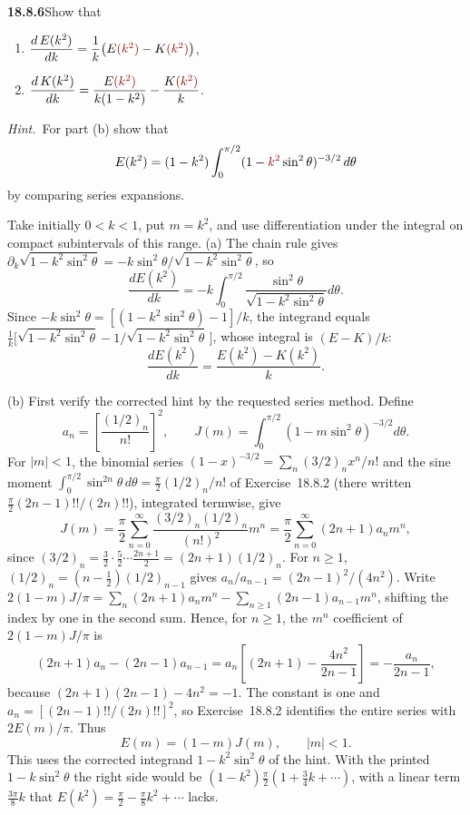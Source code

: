 \par\bigskip
\noindent\textbf{18.8.6}\quad Show that
\begin{enumerate}
\item[(a)] $\dfrac{d\,E(k^{2})}{dk}=\dfrac{1}{k}
\big(E\erratum{(k^{2})}-K\erratum{(k^{2})}\big)$,
\item[(b)] $\dfrac{d\,K(k^{2})}{dk}
=\dfrac{E\erratum{(k^{2})}}{k(1-k^{2})}
-\dfrac{K\erratum{(k^{2})}}{k}$.
\end{enumerate}
\par\emph{Hint.}~For part (b) show that
\[
E(k^{2})=(1-k^{2})\int_{0}^{\pi/2}
(1-\erratum{k^{2}}\sin^{2}\theta)^{-3/2}\,d\theta
\]
by comparing series expansions.
\par\nobreak
\solution
Take initially $0<k<1$, put $m=k^2$, and use differentiation
under the integral on compact subintervals of this range.
(a) The chain rule gives
$\partial_k\sqrt{1-k^2\sin^2\theta}
=-k\sin^2\theta/\sqrt{1-k^2\sin^2\theta}$, so
\[
\frac{dE(k^2)}{dk}
 =-k\int_0^{\pi/2}\frac{\sin^2\theta}
                             {\sqrt{1-k^2\sin^2\theta}}d\theta.
\]
Since $-k\sin^2\theta=[(1-k^2\sin^2\theta)-1]/k$, the integrand
equals
$\frac1k\bigl[\sqrt{1-k^2\sin^2\theta}
-1/\sqrt{1-k^2\sin^2\theta}\,\bigr]$, whose integral is
$(E-K)/k$:
\[
\boxed{\frac{dE(k^2)}{dk}=\frac{E(k^2)-K(k^2)}k}.
\]

(b) First verify the corrected hint by the requested series method.
Define
\[
a_n=\left[\frac{(1/2)_n}{n!}\right]^2,
\qquad J(m)=\int_0^{\pi/2}(1-m\sin^2\theta)^{-3/2}d\theta.
\]
For $|m|<1$, the binomial series
$(1-x)^{-3/2}=\sum_n(3/2)_nx^n/n!$ and the sine moment
$\int_0^{\pi/2}\sin^{2n}\theta\,d\theta=\frac\pi2(1/2)_n/n!$ of
Exercise~18.8.2 (there written $\frac\pi2(2n-1)!!/(2n)!!$), integrated
termwise, give
\[
J(m)=\frac\pi2\sum_{n=0}^\infty
 \frac{(3/2)_n(1/2)_n}{(n!)^2}m^n
 =\frac\pi2\sum_{n=0}^\infty(2n+1)a_nm^n,
\]
since $(3/2)_n=\frac32\cdot\frac52\cdots\frac{2n+1}2=(2n+1)(1/2)_n$.
For $n\ge1$, $(1/2)_n=(n-\tfrac12)(1/2)_{n-1}$ gives
$a_n/a_{n-1}=(2n-1)^2/(4n^2)$.
Write $2(1-m)J/\pi=\sum_n(2n+1)a_nm^n-\sum_{n\ge1}(2n-1)a_{n-1}m^n$,
shifting the index by one in the second sum.  Hence, for $n\ge1$,
the $m^n$ coefficient of $2(1-m)J/\pi$ is
\[
(2n+1)a_n-(2n-1)a_{n-1}
 =a_n\left[(2n+1)-\frac{4n^2}{2n-1}\right]
 =-\frac{a_n}{2n-1},
\]
because $(2n+1)(2n-1)-4n^2=-1$.  The constant is one and
$a_n=[(2n-1)!!/(2n)!!]^2$, so Exercise~18.8.2 identifies the entire
series with $2E(m)/\pi$.  Thus
\[
\boxed{E(m)=(1-m)J(m)},\qquad |m|<1.
\]
This uses the corrected integrand $1-k^2\sin^2\theta$ of the
hint.  With the printed $1-k\sin^2\theta$ the right side would be
$(1-k^2)\frac\pi2(1+\frac34k+\cdots)$, with a linear term
$\frac{3\pi}8k$ that $E(k^2)=\frac\pi2-\frac\pi8k^2+\cdots$ lacks.

